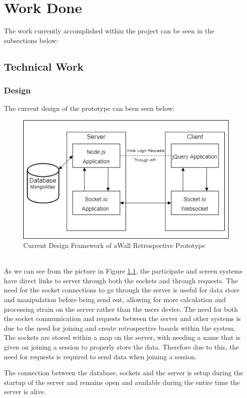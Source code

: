 \chapter{Work Done}\label{C:workdone}
The work currently accomplished within the project can be seen in the subsections below:
\section{Technical Work}
\subsection{Design}
The current design of the prototype can been seen below:
\begin{figure}[ht]
	\centering
	\includegraphics{arch_diagram}
	\caption{Current Design Framework of aWall Retrospective Prototype} \label{fig:archDiagram}
\end{figure}
\\
As we can see from the picture in Figure \ref{fig:archDiagram}, the participate and screen systems have direct links to server through both the sockets and through requests. The need for the socket connections to go through the server is useful for data store and manipulation before being send out, allowing for more calculation and processing strain on the server rather than the users device. 
The need for both the socket communication and requests between the server and other systems is due to the need for joining and create retrospective boards within the system. The sockets are stored within a map on the server, with needing a name that is given on joining a session to properly store the data. Therefore due to this, the need for requests is required to send data when joining a session.

The connection between the database, sockets and the server is setup during the startup of the server and remains open and available during the entire time the server is alive.

